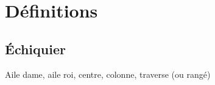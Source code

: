 \chapter{Définitions}

\section{Échiquier}

Aile dame, aile roi, centre, colonne, traverse (ou rangé)
